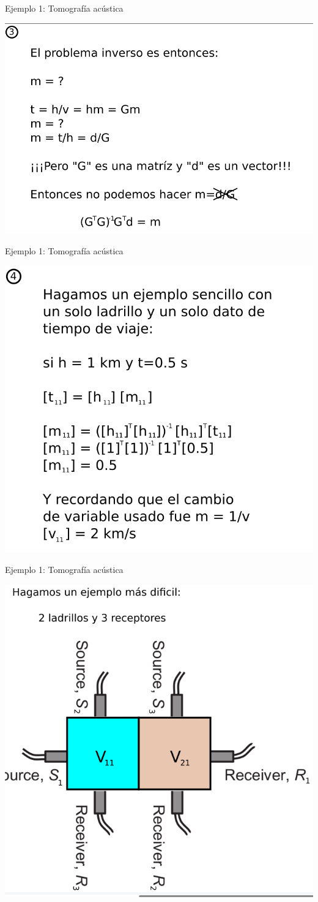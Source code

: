 \documentclass[aspectratio=169]{beamer}
\begin{document}
\begin{frame}
 {Ejemplo 1: Tomografía acústica}
 
 \begin{center}
 \includegraphics[width=0.8\linewidth]{images/tomografia_3.png}
 \end{center}

\end{frame}


\begin{frame}
 {Ejemplo 1: Tomografía acústica}
 
 \includegraphics[width=0.57\linewidth]{images/tomografia_4.png}

\end{frame}

\begin{frame}
 {Ejemplo 1: Tomografía acústica}
 
 \begin{center}
 \includegraphics[width=0.53\linewidth]{images/tomografia_5.png}
 \end{center}

\end{frame}
\end{document}
